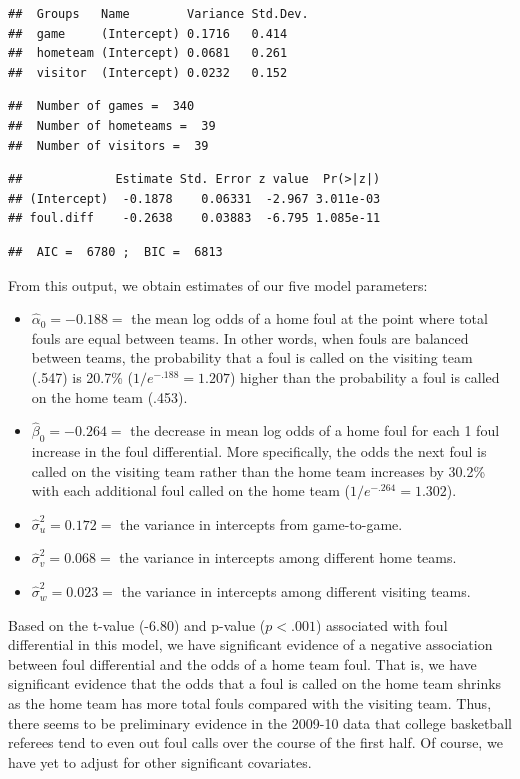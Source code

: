 \documentclass[
]{krantz}
\providecommand{\tightlist}{%
  \setlength{\itemsep}{0pt}\setlength{\parskip}{0pt}}
\begin{document}
\begin{verbatim}
##  Groups   Name        Variance Std.Dev.
##  game     (Intercept) 0.1716   0.414   
##  hometeam (Intercept) 0.0681   0.261   
##  visitor  (Intercept) 0.0232   0.152
\end{verbatim}

\begin{verbatim}
##  Number of games =  340 
##  Number of hometeams =  39 
##  Number of visitors =  39
\end{verbatim}

\begin{verbatim}
##             Estimate Std. Error z value  Pr(>|z|)
## (Intercept)  -0.1878    0.06331  -2.967 3.011e-03
## foul.diff    -0.2638    0.03883  -6.795 1.085e-11
\end{verbatim}

\begin{verbatim}
##  AIC =  6780 ;  BIC =  6813
\end{verbatim}

From this output, we obtain estimates of our five model parameters:

\begin{itemize}
\tightlist
\item
  \(\hat{\alpha}_{0}=-0.188=\) the mean log odds of a home foul at the point where total fouls are equal between teams. In other words, when fouls are balanced between teams, the probability that a foul is called on the visiting team (.547) is 20.7\% (\(1/e^{-.188}=1.207\)) higher than the probability a foul is called on the home team (.453).
\item
  \(\hat{\beta}_{0}=-0.264=\) the decrease in mean log odds of a home foul for each 1 foul increase in the foul differential. More specifically, the odds the next foul is called on the visiting team rather than the home team increases by 30.2\% with each additional foul called on the home team (\(1/e^{-.264}=1.302\)).
\item
  \(\hat{\sigma}_{u}^{2}=0.172=\) the variance in intercepts from game-to-game.
\item
  \(\hat{\sigma}_{v}^{2}=0.068=\) the variance in intercepts among different home teams.
\item
  \(\hat{\sigma}_{w}^{2}=0.023=\) the variance in intercepts among different visiting teams.
\end{itemize}

Based on the t-value (-6.80) and p-value (\(p<.001\)) associated with foul differential in this model, we have significant evidence of a negative association between foul differential and the odds of a home team foul. That is, we have significant evidence that the odds that a foul is called on the home team shrinks as the home team has more total fouls compared with the visiting team. Thus, there seems to be preliminary evidence in the 2009-10 data that college basketball referees tend to even out foul calls over the course of the first half. Of course, we have yet to adjust for other significant covariates.
\end{document}
